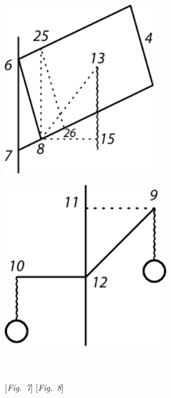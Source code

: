 \begin{minipage}[t]{0.5\textwidth}
\hspace{3mm}
\includegraphics[width=0.49\textwidth]{gesamttex/edit_VIII,3/images/LH_37_03_069-070_d07.pdf}
\end{minipage}
\hspace{5mm}
\begin{minipage}[t]{0.5\textwidth}
\includegraphics[width=0.53\textwidth]{gesamttex/edit_VIII,3/images/LH_37_03_069-070_d08.pdf}
\end{minipage}
\\
\\
\hspace*{22mm} [\textit{Fig.~7}] \label{LH_37_03_070r_d07}\hspace*{58mm} [\textit{Fig.~8}]\label{LH_37_03_070r_Fig.8}
\pend
\count{}
\count{}
\count{}
\newpage

